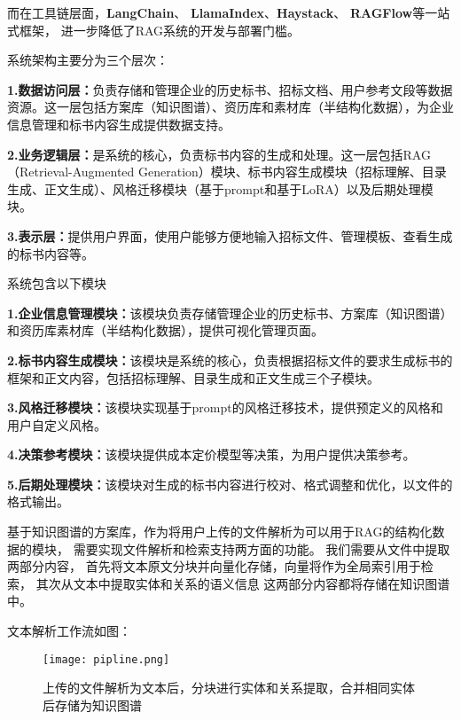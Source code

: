 \documentclass{xmu}
\begin{document}
而在工具链层面，{\bf LangChain}、
{\bf LlamaIndex}、{\bf Haystack}、
{\bf RAGFlow}等一站式框架，
进一步降低了RAG系统的开发与部署门槛。




系统架构主要分为三个层次：

{\bf 1.数据访问层：}负责存储和管理企业的历史标书、招标文档、用户参考文段等数据资源。这一层包括方案库（知识图谱）、资历库和素材库（半结构化数据），为企业信息管理和标书内容生成提供数据支持。

{\bf 2.业务逻辑层：}是系统的核心，负责标书内容的生成和处理。这一层包括RAG（Retrieval-Augmented Generation）模块、标书内容生成模块（招标理解、目录生成、正文生成）、风格迁移模块（基于prompt和基于LoRA）以及后期处理模块。

{\bf 3.表示层：}提供用户界面，使用户能够方便地输入招标文件、管理模板、查看生成的标书内容等。

系统包含以下模块

{\bf 1.企业信息管理模块：}该模块负责存储管理企业的历史标书、方案库（知识图谱）和资历库素材库（半结构化数据），提供可视化管理页面。

{\bf 2.标书内容生成模块：}该模块是系统的核心，负责根据招标文件的要求生成标书的框架和正文内容，包括招标理解、目录生成和正文生成三个子模块。

{\bf 3.风格迁移模块：}该模块实现基于prompt的风格迁移技术，提供预定义的风格和用户自定义风格。

{\bf 4.决策参考模块：}该模块提供成本定价模型等决策，为用户提供决策参考。

{\bf 5.后期处理模块：}该模块对生成的标书内容进行校对、格式调整和优化，以文件的格式输出。


基于知识图谱的方案库，作为将用户上传的文件解析为可以用于RAG的结构化数据的模块，
需要实现文件解析和检索支持两方面的功能。
我们需要从文件中提取两部分内容，
首先将文本原文分块并向量化存储，向量将作为全局索引用于检索，
其次从文本中提取实体和关系的语义信息
这两部分内容都将存储在知识图谱中。

文本解析工作流如图：

\begin{figure}[!htb]
    \centering
    \texttt{[image: pipline.png]}\\
    \caption{上传的文件解析为文本后，分块进行实体和关系提取，合并相同实体后存储为知识图谱}\label{wenbwenjiexi}
\end{figure}
\end{document}
